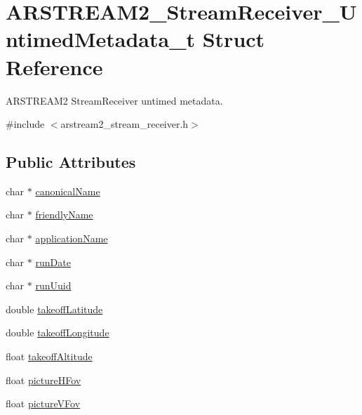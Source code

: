 \hypertarget{struct_a_r_s_t_r_e_a_m2___stream_receiver___untimed_metadata__t}{}\section{A\+R\+S\+T\+R\+E\+A\+M2\+\_\+\+Stream\+Receiver\+\_\+\+Untimed\+Metadata\+\_\+t Struct Reference}
\label{struct_a_r_s_t_r_e_a_m2___stream_receiver___untimed_metadata__t}


A\+R\+S\+T\+R\+E\+A\+M2 Stream\+Receiver untimed metadata.  




{\ttfamily \#include $<$arstream2\+\_\+stream\+\_\+receiver.\+h$>$}

\subsection*{Public Attributes}
\begin{DoxyCompactItemize}
\item 
char $\ast$ \hyperlink{struct_a_r_s_t_r_e_a_m2___stream_receiver___untimed_metadata__t_a26eea1e598f120e0e551215b98ea6596}{canonical\+Name}
\item 
char $\ast$ \hyperlink{struct_a_r_s_t_r_e_a_m2___stream_receiver___untimed_metadata__t_a19a98921ec8b031036d075d844693b9c}{friendly\+Name}
\item 
char $\ast$ \hyperlink{struct_a_r_s_t_r_e_a_m2___stream_receiver___untimed_metadata__t_abef46b37c169e6ba6fa45ce4d2e34e42}{application\+Name}
\item 
char $\ast$ \hyperlink{struct_a_r_s_t_r_e_a_m2___stream_receiver___untimed_metadata__t_ac5adda7760f41740a9f2085764d643e5}{run\+Date}
\item 
char $\ast$ \hyperlink{struct_a_r_s_t_r_e_a_m2___stream_receiver___untimed_metadata__t_a51304258d1a5b64cde5312689f5cb1c0}{run\+Uuid}
\item 
double \hyperlink{struct_a_r_s_t_r_e_a_m2___stream_receiver___untimed_metadata__t_a66d003202dc8dd76664e8268c1c6e5ba}{takeoff\+Latitude}
\item 
double \hyperlink{struct_a_r_s_t_r_e_a_m2___stream_receiver___untimed_metadata__t_a1dbd8295b643374ed9faca556772127d}{takeoff\+Longitude}
\item 
float \hyperlink{struct_a_r_s_t_r_e_a_m2___stream_receiver___untimed_metadata__t_abde6f3295eef93e090ea79dd3474d0b8}{takeoff\+Altitude}
\item 
float \hyperlink{struct_a_r_s_t_r_e_a_m2___stream_receiver___untimed_metadata__t_a82a2f320b1b999af830b38bef81bc4c5}{picture\+H\+Fov}
\item 
float \hyperlink{struct_a_r_s_t_r_e_a_m2___stream_receiver___untimed_metadata__t_a3a30e99fcdc9d44a8729ecf8796e66a8}{picture\+V\+Fov}
\end{DoxyCompactItemize}


